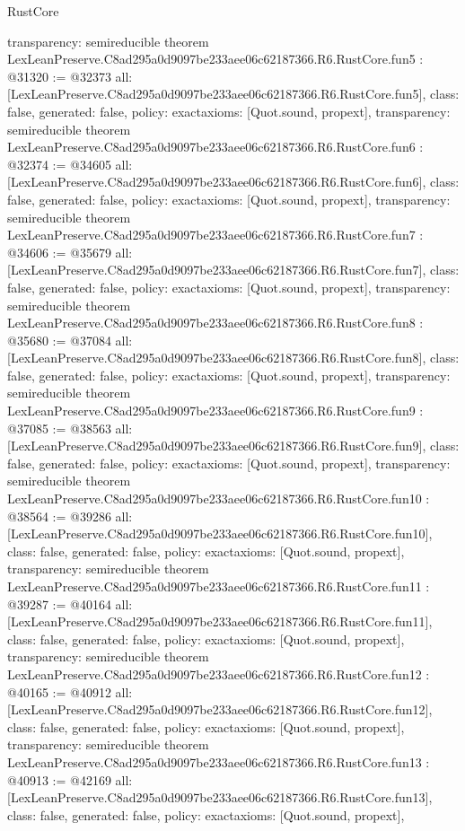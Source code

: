 \begin{lexlean}{RustCore}
\begin{coremodule}
{  transparency: semireducible
}
theorem LexLeanPreserve.C8ad295a0d9097be233aee06c62187366.R6.RustCore.fun5 : @31320 := @32373 {
  all: [LexLeanPreserve.C8ad295a0d9097be233aee06c62187366.R6.RustCore.fun5],
  class: false,
  generated: false,
  policy: exact{axioms: [Quot.sound, propext]},
  transparency: semireducible
}
theorem LexLeanPreserve.C8ad295a0d9097be233aee06c62187366.R6.RustCore.fun6 : @32374 := @34605 {
  all: [LexLeanPreserve.C8ad295a0d9097be233aee06c62187366.R6.RustCore.fun6],
  class: false,
  generated: false,
  policy: exact{axioms: [Quot.sound, propext]},
  transparency: semireducible
}
theorem LexLeanPreserve.C8ad295a0d9097be233aee06c62187366.R6.RustCore.fun7 : @34606 := @35679 {
  all: [LexLeanPreserve.C8ad295a0d9097be233aee06c62187366.R6.RustCore.fun7],
  class: false,
  generated: false,
  policy: exact{axioms: [Quot.sound, propext]},
  transparency: semireducible
}
theorem LexLeanPreserve.C8ad295a0d9097be233aee06c62187366.R6.RustCore.fun8 : @35680 := @37084 {
  all: [LexLeanPreserve.C8ad295a0d9097be233aee06c62187366.R6.RustCore.fun8],
  class: false,
  generated: false,
  policy: exact{axioms: [Quot.sound, propext]},
  transparency: semireducible
}
theorem LexLeanPreserve.C8ad295a0d9097be233aee06c62187366.R6.RustCore.fun9 : @37085 := @38563 {
  all: [LexLeanPreserve.C8ad295a0d9097be233aee06c62187366.R6.RustCore.fun9],
  class: false,
  generated: false,
  policy: exact{axioms: [Quot.sound, propext]},
  transparency: semireducible
}
theorem LexLeanPreserve.C8ad295a0d9097be233aee06c62187366.R6.RustCore.fun10 : @38564 := @39286 {
  all: [LexLeanPreserve.C8ad295a0d9097be233aee06c62187366.R6.RustCore.fun10],
  class: false,
  generated: false,
  policy: exact{axioms: [Quot.sound, propext]},
  transparency: semireducible
}
theorem LexLeanPreserve.C8ad295a0d9097be233aee06c62187366.R6.RustCore.fun11 : @39287 := @40164 {
  all: [LexLeanPreserve.C8ad295a0d9097be233aee06c62187366.R6.RustCore.fun11],
  class: false,
  generated: false,
  policy: exact{axioms: [Quot.sound, propext]},
  transparency: semireducible
}
theorem LexLeanPreserve.C8ad295a0d9097be233aee06c62187366.R6.RustCore.fun12 : @40165 := @40912 {
  all: [LexLeanPreserve.C8ad295a0d9097be233aee06c62187366.R6.RustCore.fun12],
  class: false,
  generated: false,
  policy: exact{axioms: [Quot.sound, propext]},
  transparency: semireducible
}
theorem LexLeanPreserve.C8ad295a0d9097be233aee06c62187366.R6.RustCore.fun13 : @40913 := @42169 {
  all: [LexLeanPreserve.C8ad295a0d9097be233aee06c62187366.R6.RustCore.fun13],
  class: false,
  generated: false,
  policy: exact{axioms: [Quot.sound, propext]},
}
\end{coremodule}
\end{lexlean}
